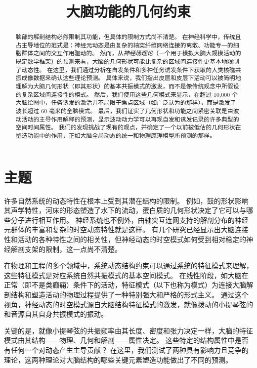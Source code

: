 \documentclass[lang=cn,a4paper,newtx]{elegantpaper}
\title{大脑功能的几何约束}
\date{}
\begin{document}
\maketitle

\begin{abstract}
脑部的解剖结构必然限制其功能，但具体的限制方式尚不清楚。
在神经科学中，传统且占主导地位的范式是：神经元动态是由复杂的轴突纤维网络连接的离散、功能专一的细胞群体之间的交互作用驱动的。
然而，从\textit{神经场理论}（一个用于模拟大脑大规模活动的既定数学框架）的预测来看，大脑的几何形状可能比复杂的区域间连接性更基本地限制了动态性。
在这里，我们通过分析在自发条件和多种任务诱发条件下获取的人类核磁共振成像数据来确认这些理论预测。
具体来说，我们指出皮层和皮层下活动可以被简明地理解为大脑几何形状（即其形状）的基本共振模式的激发，而不是像传统观念中所假设的复杂区域间连接性的模式。
然后，我们使用这些几何模式来显示，在超过 10,000 个大脑绘图中，任务诱发的激活并不局限于焦点区域（如广泛认为的那样），而是激发了波长超过 60 毫米的全脑模式。
最后，我们证实了几何形状和功能之间紧密关联是由波动活动的主导作用解释的预测，显示波动动力学可以再现自发和诱发记录的许多典型的空间时间属性。
我们的发现挑战了现有的观点，并确定了一个以前被低估的几何形状在塑造功能中的作用，正如大脑全局动态的统一和物理原理模型所预测的那样。
\end{abstract}

\section{主题}

许多自然系统的动态特性在根本上受到其潜在结构的限制。
例如，鼓的形状影响其声学特性，河床的形态塑造了水下的流动，蛋白质的几何形状决定了它可以与哪些分子进行相互作用。
神经系统也不例外，由轴突互连网支持的解剖分布的神经元群体的丰富和复杂的时空动态特性就是这样。
有几个研究已经显示出大脑连接性和活动的各种特性之间的相关性，但神经动态的时空模式如何受到相对稳定的神经解剖支架的限制，这一点尚不清楚。


在物理和工程的多个领域中，系统动态结构约束可以通过系统的特征模式来理解，这些特征模式是对应系统自然共振模式的基本空间模式。
在线性阶段，如大脑在正常（即不是类癫痫）条件下的活动，特征模式（以下也称为模式）为连接大脑解剖结构和塑造活动的物理过程提供了一种特别强大和严格的形式主义。
通过这个视角，神经动态的时空模式源自大脑结构特征模式的激发，就像拨动的小提琴弦的和音源自其自身共振模式的振动。


关键的是，就像小提琴弦的共振频率由其长度、密度和张力决定一样，大脑的特征模式由其结构——物理、几何和解剖——属性决定。
这些特定的结构属性中是否有任何一个对动态产生主导贡献？
在这里，我们测试了两种具有影响力且竞争的理论，这两种理论对大脑结构的哪些关键元素塑造功能做出了不同的预测。
\end{document}
